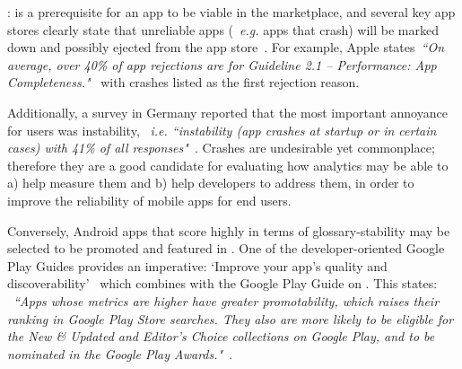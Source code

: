 : is a prerequisite for an app to be viable in the marketplace, and several key app stores clearly state that unreliable apps (~\emph{e.g.} apps that crash) will be marked down and possibly ejected from the app store~. For example, Apple states~\emph{``On average, over 40\% of app rejections are for Guideline 2.1 – Performance: App Completeness."}~ with crashes listed as the first rejection reason. %

Additionally, a survey in Germany reported that the most important annoyance for users was instability, ~\emph{i.e. ``instability (app crashes at startup or in certain cases) with 41\% of all responses"}~.  %
%
Crashes are undesirable yet commonplace; therefore they are a good candidate for evaluating how analytics may be able to a) help measure them and b) help developers to address them, in order to improve the reliability of mobile apps for end users.

Conversely, Android apps that score highly in terms of \gls{glossary-stability} may be selected to be promoted and featured in . One of the developer-oriented Google Play Guides provides an imperative: `Improve your app’s quality and discoverability'~ which combines with the Google Play Guide on . This states: ~\emph{``Apps whose metrics are higher have greater promotability, which raises their ranking in Google Play Store searches. They also are more likely to be eligible for the New \& Updated and Editor's Choice collections on Google Play, and to be nominated in the Google Play Awards."}~. %

